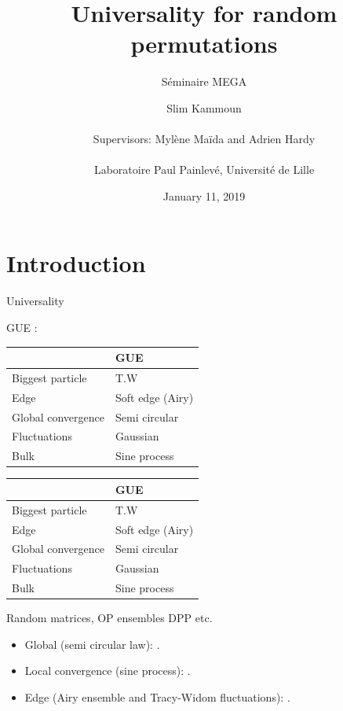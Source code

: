 \documentclass[english,xcolor=table]{beamer}
\title{Universality for random permutations}
\subtitle {Séminaire MEGA}
\author 
{ \large{ Slim Kammoun}
\\  \ \\ \large{Supervisors:  Mylène Maïda  and Adrien Hardy}
\\ \ \\ {Laboratoire Paul Painlevé, Université de Lille}
}
\date {  January 11, 2019}
\begin{document}
\begin{frame}
  \titlepage  
\end{frame}



\section*{Introduction}
\begin{frame}{Universality}
 \begin{overprint}
GUE :
\begin{table}[]
\begin{tabular}{|l|l|}
\hline
                   & GUE              \\ \hline
Biggest particle  & T.W              \\ \hline
Edge               & Soft edge (Airy) \\ \hline
Global convergence & Semi circular    \\ \hline
Fluctuations       & Gaussian         \\ \hline
Bulk               & Sine process     \\ \hline
\end{tabular}
\end{table}


\begin{table}[]
\begin{tabular}{|l|l|}
\hline
                   & GUE              \\ \hline
Biggest particle  & T.W              \\ \hline
Edge               & Soft edge (Airy) \\ \hline
Global convergence & Semi circular    \\ \hline
Fluctuations       & Gaussian         \\ \hline
Bulk               & Sine process     \\ \hline
\end{tabular}
\end{table}
Random matrices, OP ensembles DPP etc. 
    \begin{itemize}
        \item Global (semi circular law): 
        \cite{10.2307/1970008,Pastur1972}. 
        \item Local convergence (sine process): \cite*{MR2411912,Erdos2010}.
        \item Edge (Airy ensemble and Tracy-Widom fluctuations): \cite{Soshnikov1999,tao2011}.
     

\end{itemize}
\end{overprint}
\end{frame}
\end{document}
